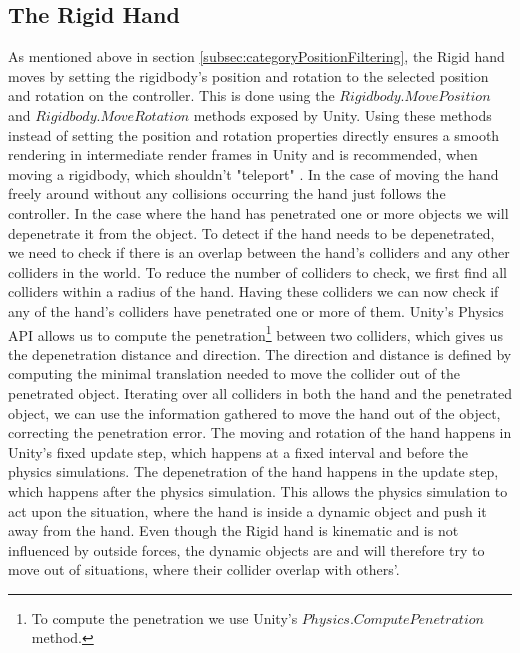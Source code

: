 \subsection{The Rigid Hand}
\label{subsec:rigidHand}
As mentioned above in section \ref{subsec:categoryPositionFiltering}, the Rigid hand moves by setting the rigidbody's position and rotation to the selected position and rotation on the controller. This is done using the $Rigidbody.MovePosition$ and $Rigidbody.MoveRotation$ methods exposed by Unity. Using these methods instead of setting the position and rotation properties directly ensures a smooth rendering in intermediate render frames in Unity and is recommended, when moving a rigidbody, which shouldn't "teleport" \parencite{UnityMovePosition2017}. In the case of moving the hand freely around without any collisions occurring the hand just follows the controller. In the case where the hand has penetrated one or more objects we will depenetrate it from the object. To detect if the hand needs to be depenetrated, we need to check if there is an overlap between the hand's colliders and any other colliders in the world. To reduce the number of colliders to check, we first find all colliders within a radius of the hand. Having these colliders we can now check if any of the hand's colliders have penetrated one or more of them. Unity's Physics API allows us to compute the penetration\footnote{To compute the penetration we use Unity's $Physics.ComputePenetration$ method.} between two colliders, which gives us the depenetration distance and direction. The direction and distance is defined by computing the minimal translation needed to move the collider out of the penetrated object. Iterating over all colliders in both the hand and the penetrated object, we can use the information gathered to move the hand out of the object, correcting the penetration error. The moving and rotation of the hand happens in Unity's fixed update step, which happens at a fixed interval and before the physics simulations. The depenetration of the hand happens in the update step, which happens after the physics simulation. This allows the physics simulation to act upon the situation, where the hand is inside a dynamic object and push it away from the hand. Even though the Rigid hand is kinematic and is not influenced by outside forces, the dynamic objects are and will therefore try to move out of situations, where their collider overlap with others'.

